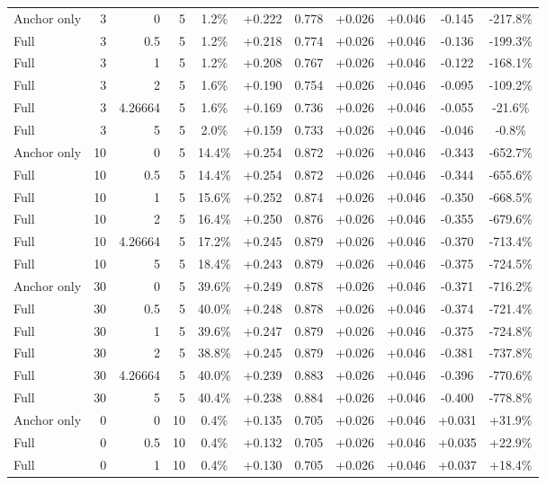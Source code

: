 \begin{table}[htbp]
\begin{tabular}{lrrrccccccc}
Anchor only & 3 & 0 & 5 & 1.2\% & +0.222 & 0.778 & +0.026 & +0.046 & -0.145 & -217.8\% \\
Full & 3 & 0.5 & 5 & 1.2\% & +0.218 & 0.774 & +0.026 & +0.046 & -0.136 & -199.3\% \\
Full & 3 & 1 & 5 & 1.2\% & +0.208 & 0.767 & +0.026 & +0.046 & -0.122 & -168.1\% \\
Full & 3 & 2 & 5 & 1.6\% & +0.190 & 0.754 & +0.026 & +0.046 & -0.095 & -109.2\% \\
Full & 3 & 4.26664 & 5 & 1.6\% & +0.169 & 0.736 & +0.026 & +0.046 & -0.055 & -21.6\% \\
Full & 3 & 5 & 5 & 2.0\% & +0.159 & 0.733 & +0.026 & +0.046 & -0.046 & -0.8\% \\
Anchor only & 10 & 0 & 5 & 14.4\% & +0.254 & 0.872 & +0.026 & +0.046 & -0.343 & -652.7\% \\
Full & 10 & 0.5 & 5 & 14.4\% & +0.254 & 0.872 & +0.026 & +0.046 & -0.344 & -655.6\% \\
Full & 10 & 1 & 5 & 15.6\% & +0.252 & 0.874 & +0.026 & +0.046 & -0.350 & -668.5\% \\
Full & 10 & 2 & 5 & 16.4\% & +0.250 & 0.876 & +0.026 & +0.046 & -0.355 & -679.6\% \\
Full & 10 & 4.26664 & 5 & 17.2\% & +0.245 & 0.879 & +0.026 & +0.046 & -0.370 & -713.4\% \\
Full & 10 & 5 & 5 & 18.4\% & +0.243 & 0.879 & +0.026 & +0.046 & -0.375 & -724.5\% \\
Anchor only & 30 & 0 & 5 & 39.6\% & +0.249 & 0.878 & +0.026 & +0.046 & -0.371 & -716.2\% \\
Full & 30 & 0.5 & 5 & 40.0\% & +0.248 & 0.878 & +0.026 & +0.046 & -0.374 & -721.4\% \\
Full & 30 & 1 & 5 & 39.6\% & +0.247 & 0.879 & +0.026 & +0.046 & -0.375 & -724.8\% \\
Full & 30 & 2 & 5 & 38.8\% & +0.245 & 0.879 & +0.026 & +0.046 & -0.381 & -737.8\% \\
Full & 30 & 4.26664 & 5 & 40.0\% & +0.239 & 0.883 & +0.026 & +0.046 & -0.396 & -770.6\% \\
Full & 30 & 5 & 5 & 40.4\% & +0.238 & 0.884 & +0.026 & +0.046 & -0.400 & -778.8\% \\
Anchor only & 0 & 0 & 10 & 0.4\% & +0.135 & 0.705 & +0.026 & +0.046 & +0.031 & +31.9\% \\
Full & 0 & 0.5 & 10 & 0.4\% & +0.132 & 0.705 & +0.026 & +0.046 & +0.035 & +22.9\% \\
Full & 0 & 1 & 10 & 0.4\% & +0.130 & 0.705 & +0.026 & +0.046 & +0.037 & +18.4\% \\

\end{tabular}
\end{table}
